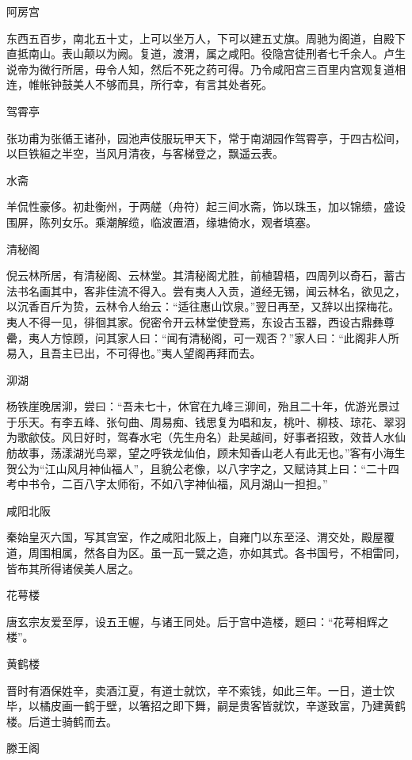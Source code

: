 \documentclass[a4paper,12pt,UTF8,twoside]{ctexbook}
\begin{document}
    阿房宫
    
    东西五百步，南北五十丈，上可以坐万人，下可以建五丈旗。周驰为阁道，自殿下直抵南山。表山颠以为阙。复道，渡渭，属之咸阳。役隐宫徒刑者七千余人。卢生说帝为微行所居，毋令人知，然后不死之药可得。乃令咸阳宫三百里内宫观复道相连，帷帐钟鼓美人不够而具，所行幸，有言其处者死。
    
    驾霄亭
    
    张功甫为张循王诸孙，园池声伎服玩甲天下，常于南湖园作驾霄亭，于四古松间，以巨铁絙之半空，当风月清夜，与客梯登之，飘遥云表。
    
    水斋
    
    羊侃性豪侈。初赴衡州，于两艖（舟符）起三间水斋，饰以珠玉，加以锦缋，盛设围屏，陈列女乐。乘潮解缆，临波置酒，缘塘倚水，观者填塞。
    
    清秘阁
    
    倪云林所居，有清秘阁、云林堂。其清秘阁尤胜，前植碧梧，四周列以奇石，蓄古法书名画其中，客非佳流不得入。尝有夷人入贡，道经无锡，闻云林名，欲见之，以沉香百斤为贽，云林令人绐云：“适往惠山饮泉。”翌日再至，又辞以出探梅花。夷人不得一见，徘徊其家。倪密令开云林堂使登焉，东设古玉器，西设古鼎彝尊罍，夷人方惊顾，问其家人曰：“闻有清秘阁，可一观否？”家人曰：“此阁非人所易入，且吾主已出，不可得也。”夷人望阁再拜而去。
    
    泖湖
    
    杨铁崖晚居泖，尝曰：“吾未七十，休官在九峰三泖间，殆且二十年，优游光景过于乐天。有李五峰、张句曲、周易痴、钱思复为唱和友，桃叶、柳枝、琼花、翠羽为歌歈伎。风日好时，驾春水宅（先生舟名）赴吴越间，好事者招致，效昔人水仙舫故事，荡漾湖光鸟翠，望之呼铁龙仙伯，顾未知香山老人有此无也。”客有小海生贺公为“江山风月神仙福人”，且貌公老像，以八字字之，又赋诗其上曰：“二十四考中书令，二百八字太师衔，不如八字神仙福，风月湖山一担担。”
    
    咸阳北阪
    
    秦始皇灭六国，写其宫室，作之咸阳北阪上，自雍门以东至泾、渭交处，殿屋覆道，周围相属，然各自为区。虽一瓦一甓之造，亦如其式。各书国号，不相雷同，皆布其所得诸侯美人居之。
    
    花萼楼
    
    唐玄宗友爱至厚，设五王幄，与诸王同处。后于宫中造楼，题曰：“花萼相辉之楼”。
    
    黄鹤楼
    
    晋时有酒保姓辛，卖酒江夏，有道士就饮，辛不索钱，如此三年。一日，道士饮毕，以橘皮画一鹤于壁，以箸招之即下舞，嗣是贵客皆就饮，辛遂致富，乃建黄鹤楼。后道士骑鹤而去。
    
    滕王阁
    
\end{document}
